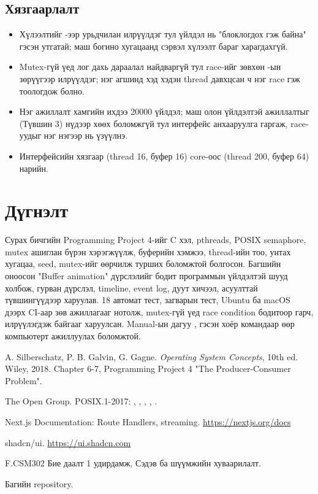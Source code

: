 \documentclass[12pt,a4paper]{article}
\newcommand{\Repo}{https://github.com/khuslenshi/os-bd1-producer-consumer}
\begin{document}
\subsection{Хязгаарлалт}
\begin{itemize}
  \item Хүлээлтийг -ээр урьдчилан илрүүлдэг тул  үйлдэл нь "блоклогдох гэж байна" гэсэн утгатай; маш богино хугацаанд сэрвэл хүлээлт бараг харагдахгүй.
  \item Mutex-гүй үед лог дахь дараалал найдваргүй тул race-ийг зөвхөн -ын зөрүүгээр илрүүлдэг; нэг агшинд хэд хэдэн thread давхцсан ч нэг race гэж тоологдож болно.
  \item Нэг ажиллалт хамгийн ихдээ 20000 үйлдэл; маш олон үйлдэлтэй ажиллалтыг (Түвшин 3) нүдээр хөөх боломжгүй тул интерфейс анхааруулга гаргаж, race-уудыг нэг нэгээр нь үзүүлнэ.
  \item Интерфейсийн хязгаар (thread 16, буфер 16) core-оос (thread 200, буфер 64) нарийн.
\end{itemize}

\section{Дүгнэлт}

Сурах бичгийн Programming Project 4-ийг C хэл, pthreads, POSIX semaphore, mutex ашиглан бүрэн хэрэгжүүлж, буферийн хэмжээ, thread-ийн тоо, унтах хугацаа, seed, mutex-ийг өөрчилж турших боломжтой болгосон. Багшийн оноосон "Buffer animation" дүрслэлийг бодит программын үйлдэлтэй шууд холбож, гурван дүрслэл, timeline, event log, дуут хичээл, асуулттай түвшингүүдээр харуулав. 18 автомат тест, загварын тест, Ubuntu ба macOS дээрх CI-аар зөв ажиллагааг нотолж, mutex-гүй үед race condition бодитоор гарч, илрүүлэгдэж байгааг харуулсан. Manual-ын дагуу ,  гэсэн хоёр командаар өөр компьютерт ажиллуулах боломжтой.

\begin{enumerate}[label={[\arabic*]},leftmargin=2.2em]
  \item A. Silberschatz, P. B. Galvin, G. Gagne. \textit{Operating System Concepts}, 10th ed. Wiley, 2018. Chapter 6-7, Programming Project 4 "The Producer-Consumer Problem".
  \item The Open Group. POSIX.1-2017: , , , , .
  \item Next.js Documentation: Route Handlers, streaming. \url{https://nextjs.org/docs}
  \item shadcn/ui. \url{https://ui.shadcn.com}
  \item F.CSM302 Бие даалт 1 удирдамж, Сэдэв ба шүүмжийн хуваарилалт.
  \item Багийн repository. \href{\Repo}{}
\end{enumerate}
\end{document}
